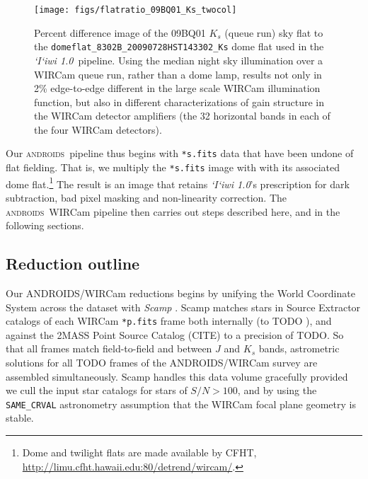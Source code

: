 \documentclass[iop]{emulateapj}
\newcommand{\sw}[1]{\textit{#1}} %
\newcommand{\iiwione}{\sw{`I`iwi 1.0}}
\newcommand{\androids}{\textsc{androids}}
\newcommand{\todo}[1]{\textcolor{RedOrange}{#1}} %
\begin{document}
\begin{figure}[t]
   \centering
    \texttt{[image: figs/flatratio\_09BQ01\_Ks\_twocol]}
    \caption{Percent difference image of the 09BQ01 $K_s$ (queue run) sky flat to the \texttt{domeflat\_8302B\_20090728HST143302\_Ks} dome flat used in the \iiwione\ pipeline. Using the median night sky illumination over a WIRCam queue run, rather than a dome lamp, results not only in 2\% edge-to-edge different in the large scale WIRCam illumination function, but also in different characterizations of gain structure in the WIRCam detector amplifiers (the 32 horizontal bands in each of the four WIRCam detectors).}
   \label{fig:domeflatratio}
\end{figure}

\vspace{1em}

Our \androids\ pipeline thus begins with \texttt{*s.fits} data that have been undone of flat fielding.
That is, we multiply the \texttt{*s.fits} image with with its associated dome flat.\footnote{Dome and twilight flats are made available by CFHT, \url{http://limu.cfht.hawaii.edu:80/detrend/wircam/}.}
The result is an image that retains \iiwione's prescription for dark subtraction, bad pixel masking and non-linearity correction.
The \androids\ WIRCam pipeline then carries out steps described here, and in the following sections.

\subsection{Reduction outline}
\label{sec:reduction_outline}

Our ANDROIDS/WIRCam reductions begins by unifying the World Coordinate System across the dataset with \sw{Scamp} \citep{Bertin:2006}.
Scamp matches stars in Source Extractor \citep{Bertin:1996} catalogs of each WIRCam \texttt{*p.fits} frame both internally (to \todo{TODO} \arcsec ), and against the 2MASS Point Source Catalog (\todo{CITE}) to a precision of \todo{TODO}\arcsec .
So that all frames match field-to-field and between $J$ and $K_s$ bands, astrometric solutions for all \todo{TODO} frames of the ANDROIDS/WIRCam survey are assembled simultaneously.  Scamp handles this data volume gracefully provided we cull the input star catalogs for stars of $S/N > 100$, and by using the \texttt{SAME\_CRVAL} astronometry assumption that the WIRCam focal plane geometry is stable.
\end{document}
